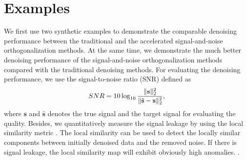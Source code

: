 \section{Examples}
We first use two synthetic examples to demonstrate the comparable denoising performance between the traditional and the accelerated signal-and-noise orthogonalization methods. At the same time, we demonstrate the much better denoising performance of the signal-and-noise orthogonalization methods compared with the traditional denoising methods. For evaluating the denoising performance, we use the signal-to-noise ratio (SNR) \cite{guochang2009,guochang2013,amir2017geo,amir2017,guochang2018weighted} defined as
\begin{equation}
\label{eq:diff}
SNR=10\log_{10}\frac{\Arrowvert \mathbf{s} \Arrowvert_2^2}{\Arrowvert \hat{\mathbf{s}} -\mathbf{s}\Arrowvert_2^2},
\end{equation}
where $\mathbf{s}$ and $\hat{\mathbf{s}}$ denotes the true signal and the target signal for evaluating the quality. Besides, we quantitatively measure the signal leakage by using the local similarity metric \cite{yangkang2015ortho,fomel2007localattr}.  The local similarity can be used to detect the locally similar components between initially denoised data and the removed noise. If there is signal leakage, the local similarity map will exhibit obviously high anomalies. . 

